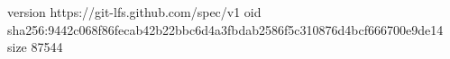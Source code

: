version https://git-lfs.github.com/spec/v1
oid sha256:9442c068f86fecab42b22bbc6d4a3fbdab2586f5c310876d4bcf666700e9de14
size 87544
